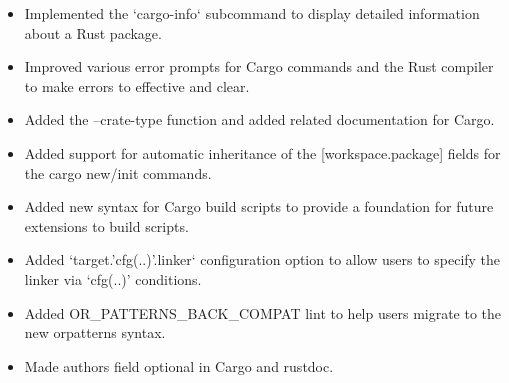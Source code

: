 \documentclass{software_engineer_dongpo_liu}
\newcommand{\en}[1]{#1}
\newcommand{\zh}[1]{}
\begin{document}
\begin{itemize}
      \item \en{Implemented the `cargo-info` subcommand to display detailed information about a Rust package.}
            \zh{为 Cargo 实现了 `cargo-info` 子命令来展示包的详细信息。}
      \item \en{Improved various error prompts for Cargo commands and the Rust compiler to make errors to effective and clear.}
            \zh{改善了大量 Cargo 命令和 Rust 编译器的错误提示，让错误更有效更清晰。}
      \item \en{Added the --crate-type function and added related documentation for Cargo.}
            \zh{为 Cargo 添加了 --crate-type 功能和相关文档。}
      \item \en{Added support for automatic inheritance of the [workspace.package] fields for the cargo new/init commands.}
            \zh{为 cargo new 和 cargo init 命令支持了 [workspace.package] 字段自动继承。}
      \item \en{Added new syntax for Cargo build scripts to provide a foundation for future extensions to build scripts.}
            \zh{为 Cargo 构建脚本添加新的语法，为未来扩展构建脚本提供基础。}
      \item \en{Added `target.'cfg(..)'.linker` configuration option to allow users to specify the linker via `cfg(..)' conditions.}
            \zh{添加了 `target.'cfg(..)'.linker` 配置项，允许用户通过 `cfg(..)' 条件来指定链接器。}
      \item \en{Added OR\_PATTERNS\_BACK\_COMPAT lint to help users migrate to the new or\-patterns syntax.}
            \zh{添加了 OR\_PATTERNS\_BACK\_COMPAT lint 来帮助用户迁移至新的 or\-patterns 语法。}
      \item \en{Made authors field optional in Cargo and rustdoc.}
            \zh{使 authors 字段在 Cargo 和 rustdoc 中可选。}
\end{itemize}


\en{}
\zh{\datedsubsection{\textbf{crates.io(Rust/JS) - 前维护者}}{{\href{https://github.com/rust-lang/crates.io/commits?author=0xPoe}{131+ commits}}}}

\en{}
\zh{\datedsubsection{\textbf{Rustup(Rust) - 前维护者}}{{\href{https://github.com/rust-lang/rustup/commits?author=0xPoe}{110+ commits}}}}
\end{document}
